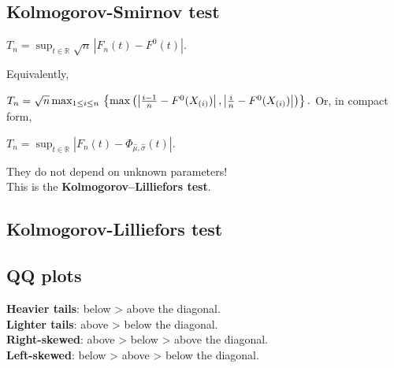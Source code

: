 \subsection{Kolmogorov-Smirnov test}

$T_n = \sup_{t \in \mathbb{R}} \sqrt{n} \, | F_n(t) - F^0(t) |.$

Equivalently,

$T_n = \sqrt{n} \max_{1 \le i \le n}\\
\left\{
\max \left( 
\left| \frac{i-1}{n} - F^0(X_{(i)}) \right|,
\left| \frac{i}{n} - F^0(X_{(i)}) \right|
\right)
\right\}.$
Or, in compact form,

$T_n = \sup_{t \in \mathbb{R}} \left| F_n(t) - \Phi_{\hat{\mu}, \hat{\sigma}}(t) \right|.$

They do not depend on unknown parameters!\\
This is the \textbf{Kolmogorov--Lilliefors test}.

\subsection{Kolmogorov-Lilliefors test}
\subsection{QQ plots}
\textbf{Heavier tails}: below > above the diagonal.\\
\textbf{Lighter tails}: above > below the diagonal.\\
\textbf{Right-skewed}: above > below > above the diagonal.\\
\textbf{Left-skewed}: below > above > below the diagonal.\\
